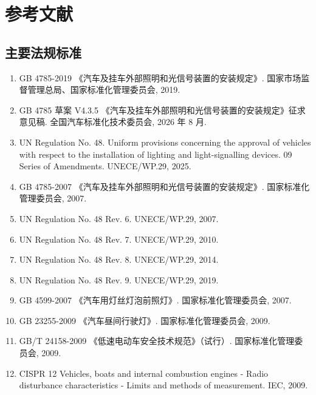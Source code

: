 \chapter{参考文献}

\section{主要法规标准}

\begin{enumerate}[leftmargin=2em]
    \item GB 4785-2019 《汽车及挂车外部照明和光信号装置的安装规定》. 国家市场监督管理总局、国家标准化管理委员会, 2019.

    \item GB 4785 草案 V4.3.5 《汽车及挂车外部照明和光信号装置的安装规定》征求意见稿. 全国汽车标准化技术委员会, 2026 年 8 月.

    \item UN Regulation No. 48. Uniform provisions concerning the approval of vehicles with respect to the installation of lighting and light-signalling devices. 09 Series of Amendments. UNECE/WP.29, 2025.

    \item GB 4785-2007 《汽车及挂车外部照明和光信号装置的安装规定》. 国家标准化管理委员会, 2007.

    \item UN Regulation No. 48 Rev. 6. UNECE/WP.29, 2007.

    \item UN Regulation No. 48 Rev. 7. UNECE/WP.29, 2010.

    \item UN Regulation No. 48 Rev. 8. UNECE/WP.29, 2014.

    \item UN Regulation No. 48 Rev. 9. UNECE/WP.29, 2019.

    \item GB 4599-2007 《汽车用灯丝灯泡前照灯》. 国家标准化管理委员会, 2007.

    \item GB 23255-2009 《汽车昼间行驶灯》. 国家标准化管理委员会, 2009.

    \item GB/T 24158-2009 《低速电动车安全技术规范》（试行）. 国家标准化管理委员会, 2009.

    \item CISPR 12 Vehicles, boats and internal combustion engines - Radio disturbance characteristics - Limits and methods of measurement. IEC, 2009.


\end{enumerate}
